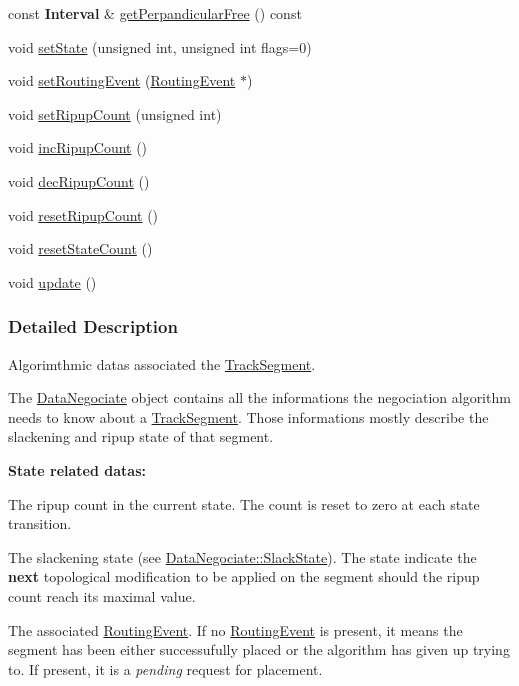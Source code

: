 \begin{DoxyCompactItemize}
const \textbf{ Interval} \& \hyperlink{classKite_1_1DataNegociate_a60d12d642a8d232241a2b07febeb980b}{get\+Perpandicular\+Free} () const
\item 
void \hyperlink{classKite_1_1DataNegociate_aafc8cd0dcd351625a12904bed7d5a7d1}{set\+State} (unsigned int, unsigned int flags=0)
\item 
void \hyperlink{classKite_1_1DataNegociate_a044867f105053d6231ab13fee23ec7b0}{set\+Routing\+Event} (\hyperlink{classKite_1_1RoutingEvent}{Routing\+Event} $\ast$)
\item 
void \hyperlink{classKite_1_1DataNegociate_a45492835bdca93f4e656dcd7ed027825}{set\+Ripup\+Count} (unsigned int)
\item 
void \hyperlink{classKite_1_1DataNegociate_ae50c33d207171246319e11e0671bc706}{inc\+Ripup\+Count} ()
\item 
void \hyperlink{classKite_1_1DataNegociate_a4f94572b3541ea2d150c75bedc8364ed}{dec\+Ripup\+Count} ()
\item 
void \hyperlink{classKite_1_1DataNegociate_a00a11ad9089d2df7b290615921e0c96a}{reset\+Ripup\+Count} ()
\item 
void \hyperlink{classKite_1_1DataNegociate_af1e8d229bb1dfcff3151d44d42a8549b}{reset\+State\+Count} ()
\item 
void \hyperlink{classKite_1_1DataNegociate_ac5c54df7ed3b930268c8d7752c101725}{update} ()
\end{DoxyCompactItemize}


\subsubsection{Detailed Description}
Algorimthmic datas associated the \hyperlink{classKite_1_1TrackSegment}{Track\+Segment}. 

The \hyperlink{classKite_1_1DataNegociate}{Data\+Negociate} object contains all the informations the negociation algorithm needs to know about a \hyperlink{classKite_1_1TrackSegment}{Track\+Segment}. Those informations mostly describe the slackening and ripup state of that segment.

{\bfseries State related datas\+:}
\begin{DoxyItemize}
\item The ripup count in the current state. The count is reset to zero at each state transition.
\item The slackening state (see \hyperlink{classKite_1_1DataNegociate_ab7ccb6fc1f298728995250a3bbcf18c7}{Data\+Negociate\+::\+Slack\+State}). The state indicate the {\bfseries next} topological modification to be applied on the segment should the ripup count reach it\textquotesingle{}s maximal value.
\item The associated \hyperlink{classKite_1_1RoutingEvent}{Routing\+Event}. If no \hyperlink{classKite_1_1RoutingEvent}{Routing\+Event} is present, it means the segment has been either successufully placed or the algorithm has given up trying to. If present, it is a {\itshape pending} request for placement.
\end{DoxyItemize}

